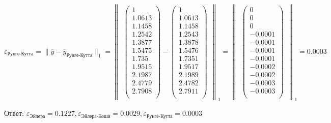 \documentclass[10pt, a4paper]{scrartcl}
\begin{document}
\(\displaystyle \varepsilon_{\text{Рунге-Кутта}} = \parallel \overline{y} - \overline{y}_{\text{Рунге-Кутта}} \parallel _1 = \begin{Vmatrix} \begin{pmatrix} 1\\ 1.0613\\ 1.1458\\ 1.2542\\ 1.3877\\ 1.5475\\ 1.735\\ 1.9515\\ 2.1987\\ 2.4779\\ 2.7908\\ \end{pmatrix} - \begin{pmatrix} 1\\ 1.0613\\ 1.1458\\ 1.2543\\ 1.3878\\ 1.5476\\ 1.7351\\ 1.9517\\ 2.1989\\ 2.4782\\ 2.7911\\ \end{pmatrix} \end{Vmatrix} _1 = \begin{Vmatrix} \begin{pmatrix} 0\\ 0\\ 0\\ -0.0001\\ -0.0001\\ -0.0001\\ -0.0001\\ -0.0002\\ -0.0002\\ -0.0003\\ -0.0003\\ \end{pmatrix}\end{Vmatrix} _1 = 0.0003\)

\vspace{5mm}

Ответ:
\(\varepsilon_{\text{Эйлера}} = 0.1227, \varepsilon_{\text{Эйлера-Коши}} = 0.0029, \varepsilon_{\text{Рунге-Кутта}} = 0.0003\)

\pagebreak
\end{document}
